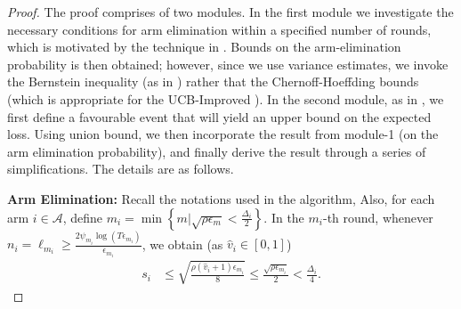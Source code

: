 \begin{proof}
The proof comprises of two modules. In the first module we investigate the necessary conditions for arm elimination within a specified number of rounds, which is motivated by the technique in \cite{auer2010ucb}. Bounds on the arm-elimination probability is then obtained; however, since we use variance estimates, we invoke the Bernstein inequality (as in \cite{audibert2009exploration}) rather that the Chernoff-Hoeffding bounds (which is appropriate for the UCB-Improved \citep{auer2010ucb}). In the second module, as in \cite{locatelli2016optimal}, we first define a favourable event that will yield an upper bound on the expected loss. Using union bound, we then incorporate the result from module-1 (on the arm elimination probability), and finally derive the result through a series of simplifications.
The details are as follows. 


\textbf{Arm Elimination:} Recall the notations used in the algorithm, Also, for each arm $i\in\mathcal{A}$, define $m_{i}=\min\left\lbrace m| \sqrt{\rho\epsilon_{m}}<\frac{\Delta_{i}}{2}\right\rbrace$. In the $m_i$-th round, whenever $n_i=\ell_{m_i}\ge\frac{2\psi_{m_i}\log{(T\epsilon_{m_{i}})}}{\epsilon_{m_{i}}}$, we obtain (as $\hat{v}_i\in[0,1]$)
%
%
\begin{align}
\label{si_bound_equn}
s_i 
&\le \sqrt{\frac{\rho(\hat{v}_i+1)\epsilon_{m_i}}{8}}
  \le \frac{\sqrt{\rho\epsilon_{m_i}}}{2} < \frac{\Delta_i}{4}.
\end{align}


\end{proof}

